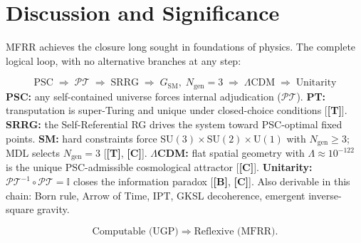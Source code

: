 \documentclass[11pt]{article}
\newcommand{\PT}{\mathcal{P}\mathcal{T}}
\newcommand{\tagT}{\textbf{[T]}}
\newcommand{\tagB}{\textbf{[B]}}
\newcommand{\tagC}{\textbf{[C]}}
\theoremstyle{plain}
\theoremstyle{definition}
\theoremstyle{remark}
\begin{document}
\section{Discussion and Significance}
\label{sec:discussion}

MFRR achieves the closure long sought in foundations of physics.
The complete logical loop, with no alternative branches at any step:

\begin{tcolorbox}[colback=blue!3,colframe=blue!40!black,
  title={\textbf{The Logical Loop (conditional on PSC premises)}},
  fonttitle=\bfseries,left=5pt,right=5pt,top=4pt,bottom=4pt]
\small
\[
\text{PSC}
\;\Rightarrow\; \PT
\;\Rightarrow\; \text{SRRG}
\;\Rightarrow\; G_{\mathrm{SM}},\; N_{\mathrm{gen}}=3
\;\Rightarrow\; \Lambda\text{CDM}
\;\Rightarrow\; \text{Unitarity}
\]
\textbf{PSC:} any self-contained universe forces internal adjudication ($\PT$).
\textbf{PT:} transputation is super-Turing and unique under closed-choice conditions [\tagT{}].
\textbf{SRRG:} the Self-Referential RG drives the system toward PSC-optimal fixed points.
\textbf{SM:} hard constraints force $\mathrm{SU}(3)\times\mathrm{SU}(2)\times\mathrm{U}(1)$
with $N_{\mathrm{gen}}\ge 3$; MDL selects $N_{\mathrm{gen}}=3$ [\tagT{}, \tagC{}].
\textbf{$\Lambda$CDM:} flat spatial geometry with $\Lambda\approx10^{-122}$ is the unique PSC-admissible cosmological attractor [\tagC{}].
\textbf{Unitarity:} $\PT^{-1}\circ\PT=\mathbb{I}$ closes the information paradox [\tagB{}, \tagC{}].
Also derivable in this chain: Born rule, Arrow of Time, IPT, GKSL decoherence, emergent inverse-square gravity.
\end{tcolorbox}

\[
\text{Computable (UGP)} \Rightarrow \text{Reflexive (MFRR)}.
\]
\end{document}
